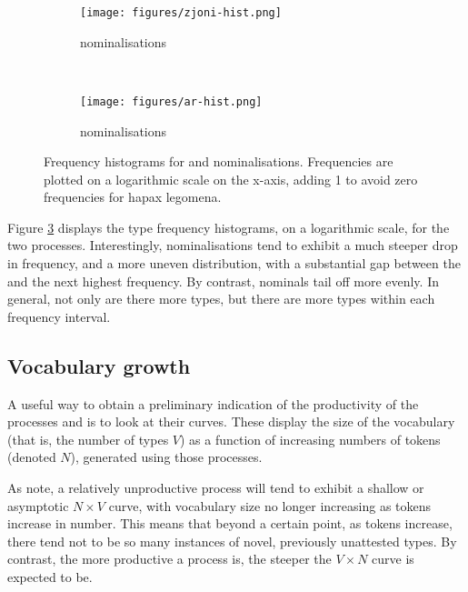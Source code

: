 \documentclass[output=paper]{LSP/langsci}
\begin{document}
\begin{figure}[t]
%
\begin{subfigure}[b]{0.45\textwidth} 
	
	\texttt{[image: figures/zjoni-hist.png]}
	\caption{{\zjoni} nominalisations}
	\label{fig:zjoni-hist}
\end{subfigure}
%
~
\begin{subfigure}[b]{0.45\textwidth} 
	
	\texttt{[image: figures/ar-hist.png]}
	\caption{{\ar} nominalisations}
	\label{fig:ar-hist}
\end{subfigure}
%
\caption{Frequency histograms for {\ar} and {\zjoni} nominalisations. Frequencies are plotted on a logarithmic scale on the x-axis, adding 1 to avoid zero frequencies for hapax legomena.}
\label{fig:hist}
\end{figure}

Figure \ref{fig:hist} displays the type frequency histograms, on a logarithmic scale, for the two processes. Interestingly, {\ar} nominalisations tend to exhibit a much steeper drop in frequency, and a more uneven distribution, with a substantial gap between the  and the next highest frequency. By contrast, {\zjoni} nominals tail off more evenly. In general, not only are there more {\zjoni} types, but there are more types within each frequency interval. 

\subsection{Vocabulary growth}\label{sec:vocab}
A useful way to obtain a preliminary indication of the productivity of the  processes {\ar} and {\zjoni} is to look at their  curves. These display the size of the vocabulary (that is, the number of types $V$) as a function of increasing numbers of tokens (denoted $N$), generated using those processes. 

As \citet{Evert} note, a relatively unproductive process will tend to exhibit a shallow or asymptotic $N \times V$ curve, with vocabulary size no longer increasing as tokens increase in number. This means that beyond a certain point, as tokens increase, there tend not to be so many instances of novel, previously unattested types. By contrast, the more productive a process is, the steeper the $V \times N$ curve is expected to be.
\end{document}
